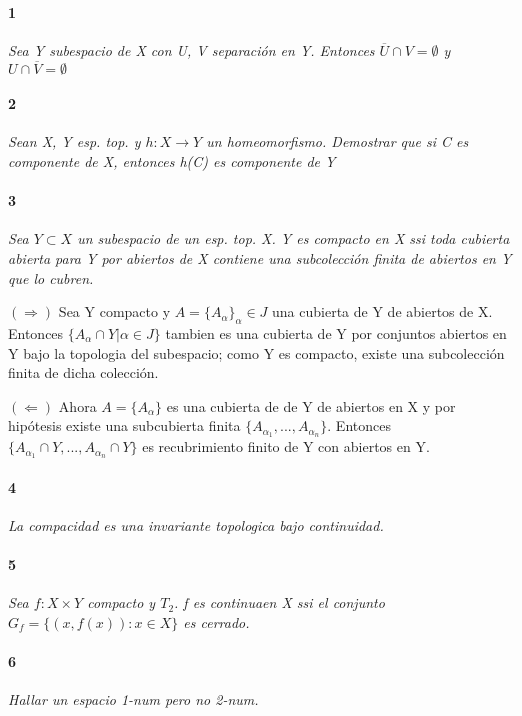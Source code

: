 \documentclass[12pt]{article}
\author{Alumnos: \\Arturo Rodriguez Contreras - 2132880 \\
Jonathan Raymundo Torres Cardenas - 1949731\\
Praxedis Jimenes Ruvalcaba \\
Erick Román Montemayor Treviño - 1957959 \\
Alexis Noe Mora Leyva \\
Everardo Flores Rivera - 2127301}
\begin{document}
\maketitle

\paragraph{1}
\textit{Sea Y subespacio de X con U, V separación en Y. Entonces $\overline{U}\cap V=\emptyset$ y $U\cap\overline{V}=\emptyset$}

\paragraph{2}
\textit{Sean X, Y esp. top. y $h:X\rightarrow Y$ un homeomorfismo. Demostrar que si C es componente de X, entonces h(C) es componente de Y}

\paragraph{3}
\textit{Sea $Y\subset X$ un subespacio de un esp. top. X. Y es compacto en X ssi toda cubierta abierta para Y por abiertos de X contiene una subcolección finita de abiertos en Y que lo cubren.}

$(\Rightarrow)$ Sea Y compacto y $A=\{A_\alpha\}_\alpha\in J$ una cubierta de Y de abiertos de X. Entonces $\{A_\alpha\cap Y|\alpha\in J\}$ tambien es una cubierta de Y por conjuntos abiertos en Y bajo la topologia del subespacio; como Y es compacto, existe una subcolección finita de dicha colección.

$(\Leftarrow)$ Ahora $A=\{A_\alpha\}$ es una cubierta de de Y de abiertos en X y por hipótesis existe una subcubierta finita $\{A_{\alpha_1},...,A_{\alpha_n}\}$. Entonces $\{A_{\alpha_1}\cap Y,...,A_{\alpha_n}\cap Y\}$ es recubrimiento finito de Y con abiertos en Y.


\paragraph{4}
\textit{La compacidad es una invariante topologica bajo continuidad.}

\paragraph{5}
\textit{Sea $f:X\times Y$ compacto y $T_2$. f es continuaen X ssi el conjunto $G_f =\{(x,f(x)):x\in X\}$ es cerrado.}

\paragraph{6}
\textit{Hallar un espacio 1-num pero no 2-num.}
\end{document}
